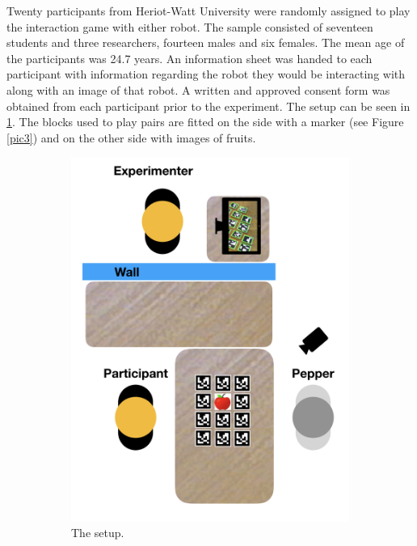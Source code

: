 \documentclass[letterpaper]{article} %
\begin{document}
Twenty participants from Heriot-Watt University were randomly assigned to play the interaction game with either robot. The sample consisted of seventeen students and three researchers, fourteen males and six females. The mean age of the participants was 24.7 years. An information sheet was handed to each participant with information regarding the robot they would be interacting with along with an image of that robot. A written and approved consent form was obtained from each participant prior to the experiment.
The setup can be seen in \ref{pic2}. The blocks used to play pairs are fitted on the side with a marker (see Figure \ref{pic3}) and on the other side with images of fruits.
\begin{figure}
    \centering
    \begin{subfigure}[b]{0.27\textwidth}
        \includegraphics[width=\textwidth]{Picture4.png}
        \caption{The setup.}
        \label{pic2}
    \end{subfigure}
    \begin{subfigure}[b]{0.12\textwidth}

\end{subfigure}
\end{figure}
\end{document}
